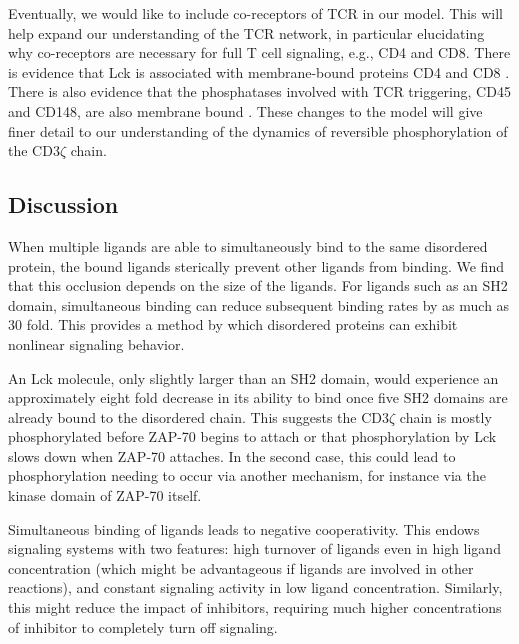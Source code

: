 \documentclass[../../AdvancementSummary.tex]{subfiles}
\begin{document}
Eventually, we would like to include co-receptors of TCR in our model. This will help expand our understanding of the TCR network, in particular elucidating why co-receptors are necessary for full T cell signaling, e.g., CD4 and CD8. There is evidence that Lck is associated with membrane-bound proteins CD4 and CD8 \cite{Barber1989, Veillette1988, Rudd1988}. There is also evidence that the phosphatases involved with TCR triggering, CD45 and CD148, are also membrane bound \cite{Davis2006}. These changes to the model will give finer detail to our understanding of the dynamics of reversible phosphorylation of the CD3$\zeta$ chain.




\subsection{Discussion}

When multiple ligands are able to simultaneously bind to the same disordered protein, the bound ligands sterically prevent other ligands from binding. We find that this occlusion depends on the size of the ligands. For ligands such as an SH2 domain, simultaneous binding can reduce subsequent binding rates by as much as 30 fold. This provides a method by which disordered proteins can exhibit nonlinear signaling behavior. 

An Lck molecule, only slightly larger than an SH2 domain, would experience an approximately eight fold decrease in its ability to bind once five SH2 domains are already bound to the disordered chain. This suggests the CD3$\zeta$ chain is mostly phosphorylated before ZAP-70 begins to attach or that phosphorylation by Lck slows down when ZAP-70 attaches. In the second case, this could lead to phosphorylation needing to occur via another mechanism, for instance via the kinase domain of ZAP-70 itself. 

Simultaneous binding of ligands leads to negative cooperativity. This endows signaling systems with two features: high turnover of ligands even in high ligand concentration (which might be advantageous if ligands are involved in other reactions), and constant signaling activity in low ligand concentration. Similarly, this might reduce the impact of inhibitors, requiring much higher concentrations of inhibitor to completely turn off signaling.



\end{document}
